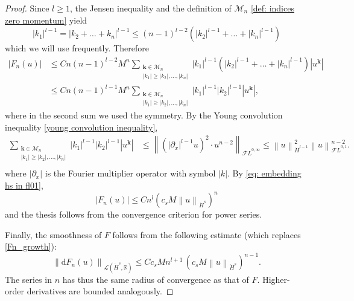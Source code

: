 \documentclass[a4paper,10pt,reqno]{article}
\theoremstyle{definition}
\theoremstyle{plain}
\theoremstyle{plain}
\theoremstyle{definition}
\theoremstyle{plain}
\theoremstyle{plain}
\theoremstyle{plain}
\theoremstyle{definition}
\theoremstyle{definition}
\newcommand{\norm}[1]{\left\lVert #1 \right\rVert}
\def \R{\mathbb R}
\def \pa{{\partial}}
\def \FL{\mathcal{F}L}
\def \M{\mathcal{M}}
\def \k{\bm{k}}
\begin{document}
\begin{proof}
Since $l\geq 1$, the Jensen inequality and the definition of $\M_n$ \eqref{def: indices zero momentum} yield
\begin{equation}
|k_1|^{l-1} = |k_2+\ldots+k_n|^{l-1} \le (n-1)^{l-2} \left ( |k_2|^{l-1} + \ldots + |k_n|^{l-1} \right )
\label{eq: jensen inequality}
\end{equation}
which we will use frequently. 
Therefore
\[
\begin{split}
|F_n(u)| &\le C n (n-1)^{l-2} M^n \sum_{ \substack{ \k \in \M_n \\ |k_1| \ge |k_2|,\ldots,|k_n|} } |k_1|^{l-1} \left ( |k_2|^{l-1}+\ldots+|k_n|^{l-1} \right ) |u^{\k}| \\
&\le C n (n-1)^{l-1} M^n \sum_{ \substack{ \k \in \M_n \\ |k_1| \ge |k_2|,\ldots,|k_n|} } |k_1|^{l-1}|k_2|^{l-1} |u^{\k}|,
\end{split}
\]
where in the second sum we used the symmetry.
By the Young convolution inequality \eqref{young convolution inequality},
\[
\begin{split}
\sum_{ \substack{ \k \in \M_n \\ |k_1| \ge |k_2|,\ldots,|k_n|} } |k_1|^{l-1}|k_2|^{l-1} |u^{\k}| & \le \norm{ \left ( |\pa_x|^{l-1} u \right )^2 \cdot u^{n-2}}_{\dot{\FL}^{0,\infty}} \le \norm{u}_{\dot{H}^{l-1}}^2 \norm{u}_{\dot{\FL}^{0,1}}^{n-2}. \\
\end{split}
\]
where $|\pa_x|$ is the Fourier multiplier operator with symbol $|k|$.
By \eqref{eq: embedding hs in fl01}, 
\begin{equation}\label{Fn_growth}
|F_n(u)| \le C n^l \left ( c_s M \norm{u}_{\dot{H}^s} \right )^n
\end{equation}
and the thesis follows from the convergence criterion for power series.

Finally, the smoothness of $F$ follows from the following estimate (which replaces \eqref{Fn_growth}):
\[
\norm{\mathrm{d}F_n(u)}_{\mathcal{L}(\dot{H}^s,\R)} \leq C c_s M n^{l+1}\,\left ( c_s M \norm{u}_{\dot{H}^s} \right )^{n-1}.
\]
The series in $n$ has thus the same radius of convergence as that of $F$. Higher-order derivatives are bounded analogously.
\end{proof}
\end{document}
